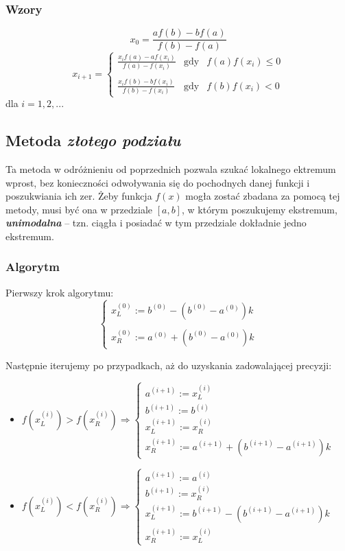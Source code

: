 \documentclass[a4paper,11pt]{article}
\begin{document}
  \subsubsection{Wzory}
    $$ x_{0}=\frac{af(b)-bf(a)}{f(b)-f(a)} $$
    $$ x_{i+1}= \left \{ \begin{array}{lll} 
    \displaystyle{\frac {x_i f(a) - a f(x_i)} {f(a) - f(x_i)}} & \textrm{gdy} & f(a)f(x_i) \le 0 \\ \\
    \displaystyle{\frac {x_i f(b) - b f(x_i)} {f(b) - f(x_i)}} & \textrm{gdy} & f(b)f(x_i) < 0 
  \end{array}\right. $$
  dla \( i = 1,2,... \)
  
  \subsection{Metoda \emph{złotego podziału}}
    Ta metoda w odróżnieniu od poprzednich pozwala szukać lokalnego ektremum wprost, bez konieczności odwoływania się do pochodnych danej funkcji i poszukwiania ich zer. Żeby funkcja \( f(x) \) mogła zostać zbadana za pomocą tej metody, musi być ona w przedziale \( [a,b] \), w którym poszukujemy ekstremum, \textbf{\emph{unimodalna}} -- tzn. ciągła i posiadać w tym przedziale dokładnie jedno ekstremum.
    \subsubsection{Algorytm}
    Pierwszy krok algorytmu:
    $$ \left\{\begin{array}{l}
    x_L^{(0)} := b^{(0)} - (b^{(0)}-a^{(0)})k \\ \\
    x_R^{(0)} := a^{(0)} + (b^{(0)}-a^{(0)})k
    \end{array}\right. $$
    
    Następnie iterujemy po przypadkach, aż do uzyskania zadowalającej precyzji:
    \begin{itemize}
      \item \( f(x_L^{(i)}) > f(x_R^{(i)}) \Rightarrow \left\{\begin{array}{l}
        a^{(i+1)} := x_L^{(i)} \\
        b^{(i+1)} := b^{(i)} \\
        x_L^{(i+1)} := x_R^{(i)} \\
        x_R^{(i+1)} := a^{(i+1)} + (b^{(i+1)}-a^{(i+1)})k
        \end{array}\right. \)
      \item \( f(x_L^{(i)}) < f(x_R^{(i)}) \Rightarrow \left\{\begin{array}{l}
        a^{(i+1)} := a^{(i)} \\
        b^{(i+1)} := x_R^{(i)} \\
        x_L^{(i+1)} := b^{(i+1)} - (b^{(i+1)}-a^{(i+1)})k \\
        x_R^{(i+1)} := x_L^{(i)}
        \end{array}\right. \)
    \end{itemize}
  
    
\end{document}

